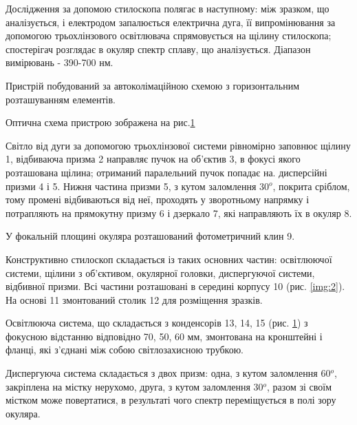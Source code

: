 \documentclass[twocolumn]{el-author}
\begin{document}
Дослідження за допомою стилоскопа полягає в наступному: між
зразком, що аналізується, і електродом запалюється електрична дуга, її
випромінювання за допомогою трьохлінзового освітлювача спрямовується на
щілину стилоскопа; спостерігач розглядає в окуляр спектр сплаву, що
аналізується. Діапазон вимірювань - 390-700 нм.

Пристрій побудований за автоколімаційною схемою з горизонтальним
розташуванням елементів.

Оптична схема пристрою зображена на рис.\ref{img:1}

\begin{figure}[h]
\caption{\source{}}
\label{img:1}
\end{figure}

Світло від дуги за допомогою трьохлінзової системи рівномірно
заповнює щілину 1, відбиваюча призма 2 направляє пучок на об'єктив 3, в
фокусі якого розташована щілина; отриманий паралельний пучок попадає на.
дисперсійні призми 4 і 5. Нижня частина призми 5, з кутом заломлення 30$^{o}$,
покрита сріблом, тому промені відбиваються від неї, проходять у
зворотньому напрямку і потрапляють на прямокутну призму 6 і дзеркало 7,
які направляють їх в окуляр 8.

У фокальній площині окуляра розташований фотометричний клин 9.

Конструктивно стилоскоп складається із таких основних частин:
освітлюючої системи, щілини з об'єктивом, окулярної головки, диспергуючої
системи, відбивної призми. Всі частини розташовані в середині корпусу 10
(рис. \ref{img:2}). На основі 11 змонтований столик 12 для розміщення зразків.

Освітлююча система, що складається з конденсорів 13, 14, 15 (рис. \ref{img:1})
з фокусною відстанню відповідно 70, 50, 60 мм, змонтована на кронштейні і
фланці, які з'єднані між собою світлозахисною трубкою.

Диспергуюча система складається з двох призм: одна, з кутом
заломлення 60$^{o}$, закріплена на містку нерухомо, друга, з кутом заломлення
30$^{o}$, разом зі своїм містком може повертатися, в результаті чого спектр
переміщується в полі зору окуляра.
\end{document}
